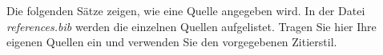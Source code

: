 \documentclass[praktikum,german]{hgbthesis}
\begin{document}
\vspace{1cm}
\noindent Die folgenden Sätze zeigen, wie eine Quelle angegeben wird. In der Datei \textit{references.bib} werden die einzelnen Quellen
aufgelistet. Tragen Sie hier Ihre eigenen Quellen ein und verwenden Sie den vorgegebenen Zitierstil.\\





\printbibliography[heading=bibintoc]
\end{document}
